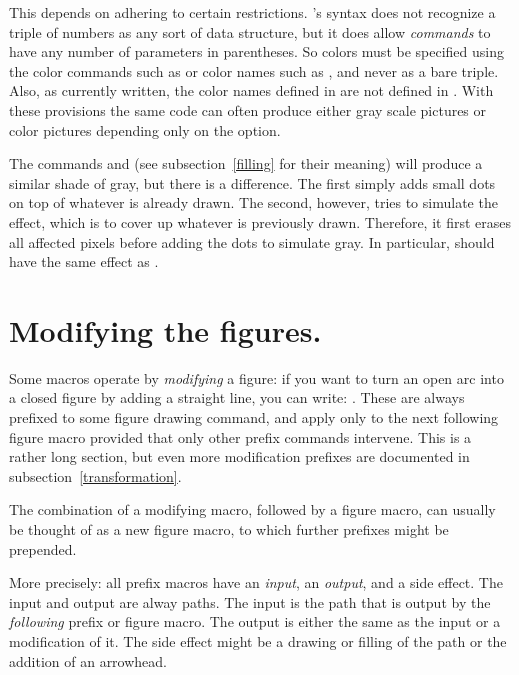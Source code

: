 \documentclass[letterpaper]{article}
\begin{document}
This depends on adhering to certain restrictions. \CMF{}'s syntax
does not recognize a triple of numbers as any sort of data structure,
but it does allow \emph{commands} to have any number of parameters in
parentheses. So colors must be specified using the color commands such
as  or color names such as , and never as a
bare triple. Also, as currently written, the color names defined in
 are not defined in \MF{}. With these provisions the
same \mfp{} code can often produce either gray scale \MF{} pictures or
\MP{} color pictures depending only on the  option.

The commands  and  (see
subsection~\ref{filling} for their meaning) will produce a similar shade
of gray, but there is a difference. The first simply adds small dots on
top of whatever is already drawn. The second, however, tries to simulate
the \MP{} effect, which is to cover up whatever is previously drawn.
Therefore, it first erases all affected pixels before adding the dots to
simulate gray. In particular,  should have the
same effect as .


\section{Modifying the figures.}\label{modifier}

Some \mfp{} macros operate by \emph{modifying} a figure: if you want to
turn an open arc into a closed figure by adding a straight line, you can
write: . These are always
prefixed to some figure drawing command, and apply only to the next
following figure macro provided that only other prefix commands
intervene. This is a rather long section, but even more modification
prefixes are documented in subsection~\ref{transformation}.

The combination of a modifying macro, followed by a figure macro, can
usually be thought of as a new figure macro, to which further prefixes
might be prepended.

More precisely: all prefix macros have an \emph{input}, an
\emph{output}, and a side effect. The input and output are alway paths.
The input is the path that is output by the \emph{following} prefix or
figure macro. The output is either the same as the input or a
modification of it. The side effect might be a drawing or filling of the
path or the addition of an arrowhead.
\end{document}
